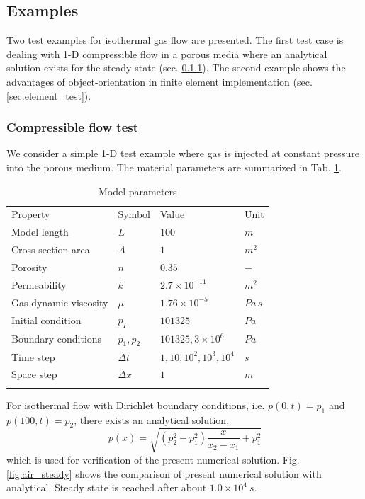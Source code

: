 \subsection{Examples}

Two test examples for isothermal gas flow are presented. The first test case is dealing with 1-D compressible flow in a porous media where an analytical solution exists for the steady state (sec. \ref{sec:flow_test}). The second example shows the advantages of object-orientation in finite element implementation (sec. \ref{sec:element_test}).

\subsubsection{Compressible flow test}
\label{sec:flow_test}

We consider a simple 1-D test example where gas is injected at constant pressure into the porous medium. The material
parameters are summarized in Tab. \ref{tab:air_heat_1d}.

\begin{table}[htb!]
\centering
\begin{tabular}{llll}
\hline\hline\noalign{\smallskip}
Property & Symbol & Value & Unit \\
\noalign{\smallskip}\hline\noalign{\smallskip}
Model length & $L$ & $100$ & $m$\\
Cross section area & $A$ & $1$  & $m^2$ \\
Porosity & $n$ & $0.35$  & $-$ \\
\hline
Permeability & $k$ & $2.7\times 10^{-11}$ & $m^2$\\
Gas dynamic viscosity & $\mu$ & $1.76\times 10^{-5}$ & $Pa\,s$\\
Initial condition & $p_I$ & $101325$ & $Pa$\\
Boundary conditions & $p_1, p_2$ & $101325, 3 \times 10^6$ & $Pa$\\
\hline
Time step & $\Delta t$ & $1,10,10^2,10^3,10^4$ & $s$\\
Space step & $\Delta x$ & $1$ & $m$\\
\noalign{\smallskip}\hline\hline
\end{tabular}
\caption{Model parameters}
\label{tab:air_heat_1d}
\end{table}

For isothermal flow with Dirichlet boundary conditions, i.e. $p(0,t)=p_1$ and
$p(100,t)=p_2$, there exists an analytical solution,
%
\begin{equation}
p(x)
=
\sqrt{(p_2^2-p_1^2)\frac{x}{x_2-x_1}+p_1^2}
\label{eqn:press_analytical}
\end{equation}
%
which is used for verification of the present numerical solution. 
%
Fig. \ref{fig:air_steady} shows the comparison of present numerical solution with analytical. Steady state is reached after about $1.0\times10^4~s$.

